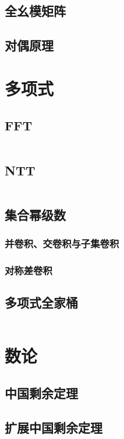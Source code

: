 \documentclass[10pt, a4paper, oneside]{ctexart}
\begin{document}
\begin{multicols}{2}
        \subsection{全幺模矩阵}
        
        \subsection{对偶原理}
        

        \section{多项式}
        \subsection{FFT}
        \inputminted{cpp}{src/poly/fft.cpp}
        \subsection{NTT}
        \inputminted{cpp}{src/poly/ntt.cpp}
        \subsection{集合幂级数}
        \subsubsection{并卷积、交卷积与子集卷积}
        
        \subsubsection{对称差卷积}
        
        \subsection{多项式全家桶}
        \inputminted{cpp}{src/poly/poly.cpp}

        \section{数论}
        \subsection{中国剩余定理}
        
        \subsection{扩展中国剩余定理}
        

\end{multicols}
\end{document}
